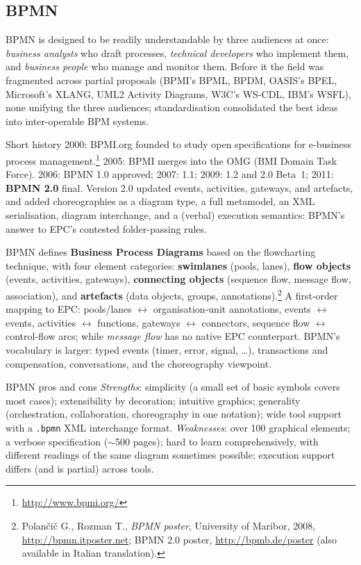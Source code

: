 \subsection{BPMN}

BPMN is designed to be readily understandable by three audiences at once: \emph{business analysts} who draft processes, \emph{technical developers} who implement them, and \emph{business people} who manage and monitor them. Before it the field was fragmented across partial proposals (BPMI's BPML, BPDM, OASIS's BPEL, Microsoft's XLANG, UML2 Activity Diagrams, W3C's WS-CDL, IBM's WSFL), none unifying the three audiences; standardisation consolidated the best ideas into inter-operable BPM systems.

\begin{notebox}{Short history}
2000: BPMI.org founded to study open specifications for e-business process management.\footnote{\url{http://www.bpmi.org/}} 2005: BPMI merges into the OMG (BMI Domain Task Force). 2006: BPMN 1.0 approved; 2007: 1.1; 2009: 1.2 and 2.0 Beta~1; 2011: \textbf{BPMN 2.0} final. Version 2.0 updated events, activities, gateways, and artefacts, and added choreographies as a diagram type, a full metamodel, an XML serialisation, diagram interchange, and a (verbal) execution semantics: BPMN's answer to EPC's contested folder-passing rules.
\end{notebox}

BPMN defines \textbf{Business Process Diagrams} based on the flowcharting technique, with four element categories: \textbf{swimlanes} (pools, lanes), \textbf{flow objects} (events, activities, gateways), \textbf{connecting objects} (sequence flow, message flow, association), and \textbf{artefacts} (data objects, groups, annotations).\footnote{Polan\v{c}i\v{c} G., Rozman T., \emph{BPMN poster}, University of Maribor, 2008, \url{http://bpmn.itposter.net}; BPMN 2.0 poster, \url{http://bpmb.de/poster} (also available in Italian translation).} A first-order mapping to EPC: pools/lanes $\leftrightarrow$ organisation-unit annotations, events $\leftrightarrow$ events, activities $\leftrightarrow$ functions, gateways $\leftrightarrow$ connectors, sequence flow $\leftrightarrow$ control-flow arcs; while \emph{message flow} has no native EPC counterpart. BPMN's vocabulary is larger: typed events (timer, error, signal, \dots), transactions and compensation, conversations, and the choreography viewpoint.

\begin{notebox}{BPMN pros and cons}
\emph{Strengths}: simplicity (a small set of basic symbols covers most cases); extensibility by decoration; intuitive graphics; generality (orchestration, collaboration, choreography in one notation); wide tool support with a \texttt{.bpmn} XML interchange format. \emph{Weaknesses}: over 100 graphical elements; a verbose specification ($\sim$500 pages); hard to learn comprehensively, with different readings of the same diagram sometimes possible; execution support differs (and is partial) across tools.
\end{notebox}

